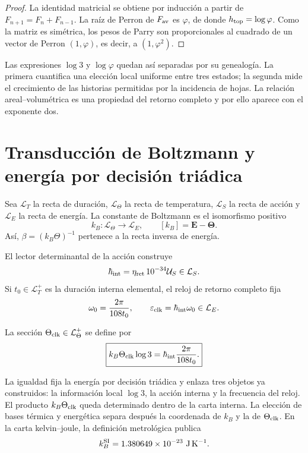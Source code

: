 \begin{proof}
La identidad matricial se obtiene por inducción a partir de
\(F_{n+1}=F_n+F_{n-1}\). La raíz de Perron de \(F_{\rm av}\) es \(\varphi\),
de donde \(h_{\rm top}=\log\varphi\). Como la matriz es simétrica, los pesos
de Parry \cite{Parry1964} son proporcionales al cuadrado de un vector de Perron
\((1,\varphi)\), es decir, a \((1,\varphi^2)\).
\end{proof}

Las expresiones \(\log3\) y \(\log\varphi\) quedan así separadas por su
genealogía. La primera cuantifica una elección local uniforme entre tres
estados; la segunda mide el crecimiento de las historias permitidas por la
incidencia de hojas. La relación areal--volumétrica es una propiedad del
retorno completo y por ello aparece con el exponente dos.

\section{Transducción de Boltzmann y energía por decisión triádica}

Sea \(\mathcal L_T\) la recta de duración, \(\mathcal L_\Theta\) la recta de
temperatura, \(\mathcal L_S\) la recta de acción y \(\mathcal L_E\) la recta
de energía. La constante de Boltzmann es el isomorfismo positivo
\begin{equation}
 \boxed{
 k_B:\mathcal L_\Theta\longrightarrow\mathcal L_E,
 \qquad [k_B]=\mathbf E-\boldsymbol\Theta.}
 \label{eq:boltzmann-transductor-anexo}
\end{equation}
Así, \(\beta=(k_B\Theta)^{-1}\) pertenece a la recta inversa de energía.

El lector determinantal de la acción construye
\[
 \hbar_{\rm int}
 =\eta_{\rm ret}\,10^{-34}\mathcal U_S\in\mathcal L_S.
\]
Si \(t_0\in\mathcal L_T^+\) es la duración interna elemental, el reloj de
retorno completo fija
\[
 \omega_0=\frac{2\pi}{108t_0},
 \qquad
 \varepsilon_{\rm clk}=\hbar_{\rm int}\omega_0\in\mathcal L_E.
\]

\begin{definition}
La sección \(\Theta_{\rm clk}\in\mathcal L_\Theta^+\) se define por
\begin{equation}
 \boxed{
 k_B\Theta_{\rm clk}\log3
 =\hbar_{\rm int}\frac{2\pi}{108t_0}.}
 \label{eq:boltzmann-accion-informacion-anexo}
\end{equation}
\end{definition}

La igualdad fija la energía por decisión triádica y enlaza tres objetos ya
construidos: la información local \(\log3\), la acción interna y la frecuencia
del reloj. El producto \(k_B\Theta_{\rm clk}\) queda determinado dentro de la
carta interna. La elección de bases térmica y energética separa después la
coordenada de \(k_B\) y la de \(\Theta_{\rm clk}\). En la carta kelvin--joule,
la definición metrológica publica
\[
 k_B^{\rm SI}=1.380649\times10^{-23}\ \mathrm{J\,K^{-1}}.
\]

